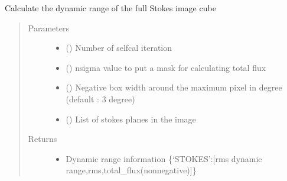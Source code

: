 \documentclass[letterpaper,10pt,english]{sphinxmanual}
\begin{document}
\begin{fulllineitems}
\begin{fulllineitems}
\begin{quote}
\begin{description}
\begin{itemize}
\end{itemize}


\end{description}\end{quote}

\end{fulllineitems}


\begin{fulllineitems}
\label{\detokenize{paircars:paircars.intensity_selfcal_LTS.IntensitySelfcal.calc_dyn_range}}
\sphinxAtStartPar
Calculate the dynamic range of the full Stokes image cube
\begin{quote}\begin{description}
\item[{Parameters}] \leavevmode\begin{itemize}
\item {} 
\sphinxAtStartPar
{} () \textendash{} Number of selfcal iteration

\item {} 
\sphinxAtStartPar
{} () \textendash{} nsigma value to put a mask for calculating total flux

\item {} 
\sphinxAtStartPar
{} () \textendash{} Negative box width around the maximum pixel in degree (default : 3 degree)

\item {} 
\sphinxAtStartPar
{} () \textendash{} List of stokes planes in the image

\end{itemize}

\item[{Returns}] \leavevmode
\sphinxAtStartPar
\begin{itemize}
\item {} 
\sphinxAtStartPar
{} \textendash{} Dynamic range information \{‘STOKES’:{[}rms dynamic range,rms,total\_flux(non\sphinxhyphen{}negative){]}\}


\end{itemize}
\end{description}
\end{quote}
\end{fulllineitems}
\end{fulllineitems}
\end{document}
